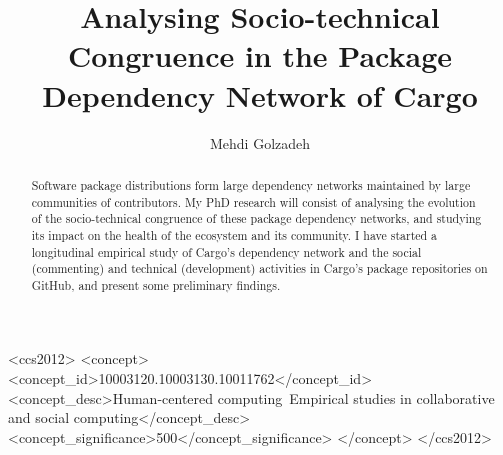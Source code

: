 \documentclass[sigconf,screen]{acmart}
\begin{document}
	
\title{Analysing Socio-technical Congruence in the Package Dependency Network of Cargo}

	\author{Mehdi Golzadeh}
	
	\newcommand*{\Scale}[2][4]{\scalebox{#1}{$#2$}}%
	\newcommand{\Tool}{ComAir\xspace}
	\newcommand{\ComBugs}{30\xspace}
	
	
	
	
	
\begin{abstract}
Software package distributions form large dependency networks maintained by large communities of contributors. My PhD research will consist of analysing the evolution of the socio-technical congruence of these package dependency networks, and studying its impact on the health of the ecosystem and its community.
I have started a longitudinal empirical study of Cargo's dependency network and the social (commenting) and technical (development) activities in Cargo's package repositories on GitHub, and present some preliminary findings.
\end{abstract}


\begin{CCSXML}
<ccs2012>
	<concept>
		<concept_id>10003120.10003130.10011762</concept_id>
		<concept_desc>Human-centered computing~Empirical studies in collaborative and social computing</concept_desc>
		<concept_significance>500</concept_significance>
	</concept>
</ccs2012>
\end{CCSXML}
\end{document}
